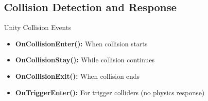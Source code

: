 \subsection{Collision Detection and Response}

\begin{definition}{Unity Collision Events}
    \begin{itemize}
        \item \textbf{OnCollisionEnter():} When collision starts
        \item \textbf{OnCollisionStay():} While collision continues
        \item \textbf{OnCollisionExit():} When collision ends
        \item \textbf{OnTriggerEnter():} For trigger colliders (no physics response)
    \end{itemize}
\end{definition}

